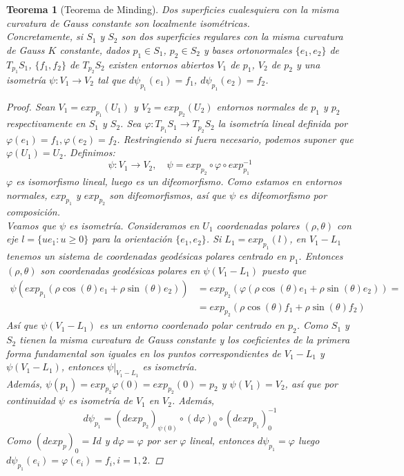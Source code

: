 \documentclass{report}
\newtheorem{theorem}{Teorema}[chapter]
\theoremstyle{remark}
\theoremstyle{remark}
\theoremstyle{definition}
\theoremstyle{definition}
\theoremstyle{definition}
\begin{document}
\begin{theorem}[Teorema de Minding]
    Dos superficies cualesquiera con la misma curvatura de Gauss constante son localmente isométricas.\\
    Concretamente, si $S_1$ y $S_2$ son dos superficies regulares con la misma curvatura de Gauss $K$ constante, dados $p_1 \in S_1$, $p_2 \in S_2$ y bases ortonormales $\{e_1,e_2\}$ de $T_{p_1}S_1$, $\{f_1,f_2\}$ de $T_{p_2}S_2$ existen entornos abiertos $V_1$ de $p_1$, $V_2$ de $p_2$ y una isometría $\psi : V_1 \to V_2$ tal que $d\psi_{p_1}(e_1) = f_1$, $d\psi_{p_1}(e_2) = f_2$.

    \begin{proof}
        Sean $V_1 = exp_{p_1}(U_1)$ y $V_2 = exp_{p_2}(U_2)$ entornos normales de $p_1$ y $p_2$ respectivamente en $S_1$ y $S_2$.
        Sea $\varphi: T_{p_1}S_1 \to T_{p_2}S_2$ la isometría lineal definida por $\varphi(e_1) = f_1, \varphi(e_2) = f_2$.
        Restringiendo si fuera necesario, podemos suponer que $\varphi(U_1) = U_2$.
        Definimos: $$\psi: V_1 \to V_2, \quad \psi = exp_{p_2} \circ \varphi \circ exp_{p_1}^{-1}$$
        $\varphi$ es isomorfismo lineal, luego es un difeomorfismo.
        Como estamos en entornos normales, $exp_{p_1}$ y $exp_{p_2}$ son difeomorfismos, así que $\psi$ es difeomorfismo por composición.\\
        Veamos que $\psi$ es isometría.
        Consideramos en $U_1$ coordenadas polares $(\rho, \theta)$ con eje $l = \{ ue_1 : u \geq 0 \}$ para la orientación $\{ e_1, e_2 \}$.
        Si $L_1 = exp_{p_1}(l)$, en $V_1 - L_1$ tenemos un sistema de coordenadas geodésicas polares centrado en $p_1$.
        Entonces $(\rho, \theta)$ son coordenadas geodésicas polares en $\psi(V_1 - L_1)$ puesto que
        \begin{align*}
            \psi(exp_{p_1}(\rho \cos(\theta) e_1 + \rho \sin(\theta) e_2)) & = exp_{p_2} (\varphi(\rho \cos(\theta) e_1 + \rho \sin(\theta) e_2)) = \\
                                                                           & = exp_{p_2}(\rho \cos(\theta) f_1 + \rho \sin(\theta) f_2)
        \end{align*}
        Así que $\psi(V_1 - L_1)$ es un entorno coordenado polar centrado en $p_2$.
        Como $S_1$ y $S_2$ tienen la misma curvatura de Gauss constante y los coeficientes de la primera forma fundamental son iguales en los puntos correspondientes de $V_1 - L_1$ y $\psi(V_1 - L_1)$, entonces $\psi|_{V_1 - L_1}$ es isometría.\\
        Además, $\psi(p_1) = exp_{p_2}\varphi(0) = exp_{p_2}(0) = p_2$ y $\psi(V_1) = V_2$, así que por continuidad $\psi$ es isometría de $V_1$ en $V_2$.
        Además, $$d\psi_{p_1} = (dexp_{p_2})_{\psi(0)} \circ (d\varphi)_0 \circ (dexp_{p_1})_0^{-1}$$
        Como $(dexp_p)_0 = Id$ y $d\varphi = \varphi$ por ser $\varphi$ lineal, entonces $d\psi_{p_1} = \varphi$ luego $d\psi_{p_1}(e_i) = \varphi(e_i) = f_i, i = 1, 2$.
    \end{proof}
\end{theorem}
\end{document}
